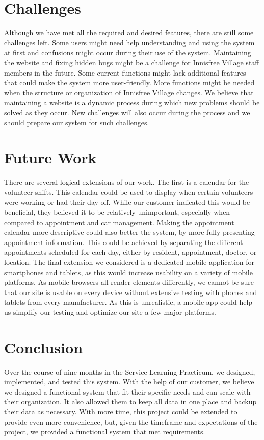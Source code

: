 \documentclass{sig-alternate}
\begin{document}
\section{Challenges}
Although we have met all the required and desired features, there are still some challenges left. Some users might need help understanding and using the system at first and confusions might occur during their use of the system. Maintaining the website and fixing hidden bugs might be a challenge for Innisfree Village staff members in the future. Some current functions might lack additional features that could make the system more user-friendly. More functions might be needed when the structure or organization of Innisfree Village changes. We believe that maintaining a website is a dynamic process during which new problems should be solved as they occur. New challenges will also occur during the process and we should prepare our system for such challenges.

\section{Future Work}
There are several logical extensions of our work. The first is a calendar for the volunteer shifts. This calendar could be used to display when certain volunteers were working or had their day off. While our customer indicated this would be beneficial, they believed it to be relatively unimportant, especially when compared to appointment and car management. Making the appointment calendar more descriptive could also better the system, by more fully presenting appointment information. This could be achieved by separating the different appointments scheduled for each day, either by resident, appointment, doctor, or location. The final extension we considered is a dedicated mobile application for smartphones and tablets, as this would increase usability on a variety of mobile platforms. As mobile browsers all render elements differently, we cannot be sure that our site is usable on every device without extensive testing with phones and tablets from every manufacturer. As this is unrealistic, a mobile app could help us simplify our testing and optimize our site a few major platforms.

\section{Conclusion}
Over the course of nine months in the Service Learning Practicum, we designed, implemented, and tested this system. With the help of our customer, we believe we designed a functional system that fit their specific needs and can scale with their organization. It also allowed them to keep all data in one place and backup their data as necessary. With more time, this project could be extended to provide even more convenience, but, given the timeframe and expectations of the project, we provided a functional system that met requirements. 
\end{document}
